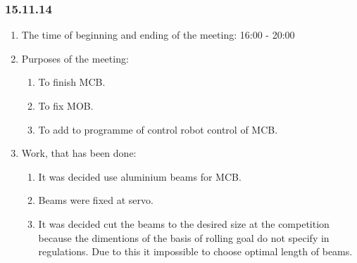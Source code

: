 
\subsubsection{15.11.14}

\begin{enumerate} 
	\item The time of beginning and ending of the meeting: 16:00 - 20:00
	
	\item Purposes of the meeting:
	\begin{enumerate}
		\item To finish MCB.
		
		\item To fix MOB.
		
		\item To add to programme of control robot control of MCB.
		
	\end{enumerate}
	
	\item Work, that has been done:
	\begin{enumerate}
		\item It was decided use aluminium beams for MCB.
		
		\item Beams were fixed at servo.
		
		\item It was decided cut the beams to the desired size at the competition because the dimentions of the basis of rolling goal do not specify in regulations. Due to this it impossible to choose optimal length of beams.
		

\end{enumerate}
\end{enumerate}
